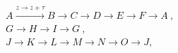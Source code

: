 \begin{equation}
  \begin{split}
&A \stackrel{z\to z+\tau}{\longrightarrow} B \to C
  \to D \to E \to F \to A~,\\
&G \to H \to I \to G~,\\
&J \to K \to L \to M \to N \to O \to J,
  \end{split}
\end{equation}

